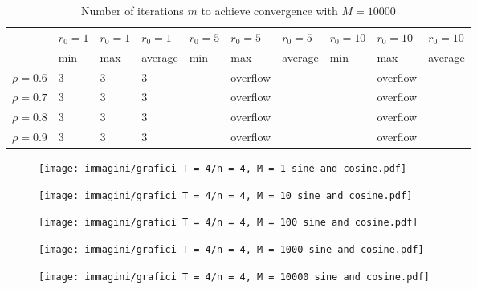 \documentclass[a4paper,11pt,openright]{report}
\begin{document}
\begin{table}[H]
\centering
\addtolength{\leftskip}{-1.5cm}
\addtolength{\rightskip}{-1.5cm}
\begin{tabular}{|c|lllllllll|}
\hline
$ $ & $r_0 = 1$ & $r_0 = 1$ & $r_0 = 1$ & $r_0 = 5$ & $r_0 = 5$ & $r_0 = 5$ & $r_0 = 10$ & $r_0 = 10$ & $r_0 = 10$  \\
$ $ & min & max & average & min & max & average & min & max & average \\ 
\hline
$\rho = 0.6$ & 3 & 3 & 3 &  & overflow & &  & overflow &  \\

$\rho = 0.7$ & 3 & 3 & 3 &  & overflow & &  & overflow &  \\

$\rho = 0.8$ & 3 & 3 & 3 &  & overflow & &  & overflow &  \\

$\rho = 0.9$ & 3 & 3 & 3 &  & overflow & &  & overflow &  \\
\hline
\end{tabular}
\caption{Number of iterations $m$ to achieve convergence with $M = 10000$}
\end{table}
\begin{figure}[H]
\centering
\texttt{[image: immagini/grafici T = 4/n = 4, M = 1 sine and cosine.pdf]}
\end{figure}
\begin{figure}[H]
\centering
\texttt{[image: immagini/grafici T = 4/n = 4, M = 10 sine and cosine.pdf]}
\end{figure}
\begin{figure}[H]
\centering
\texttt{[image: immagini/grafici T = 4/n = 4, M = 100 sine and cosine.pdf]}
\end{figure}
\begin{figure}[H]
\centering
\texttt{[image: immagini/grafici T = 4/n = 4, M = 1000 sine and cosine.pdf]}
\end{figure}
\begin{figure}[H]
\centering
\texttt{[image: immagini/grafici T = 4/n = 4, M = 10000 sine and cosine.pdf]}
\end{figure}
\newpage
\end{document}
